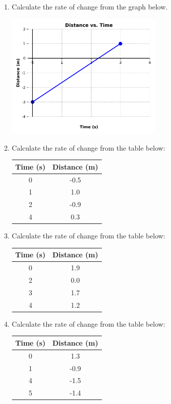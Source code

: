 \documentclass[12pt]{article}
\begin{document}
\begin{enumerate}
\vspace{2cm}  %
\item Calculate the rate of change from the graph below.

\includegraphics[width=0.6\textwidth]{A_problem_4.png}


\vspace{2cm}  %
\item Calculate the rate of change from the table below:

\begin{tabular}{|c|c|}
\hline
Time (s) & Distance (m) \\
\hline
0 & -0.5 \\
1 & 1.0 \\
2 & -0.9 \\
4 & 0.3 \\
\hline
\end{tabular}

\vspace{2cm}
\item Calculate the rate of change from the table below:

\begin{tabular}{|c|c|}
\hline
Time (s) & Distance (m) \\
\hline
0 & 1.9 \\
2 & 0.0 \\
3 & 1.7 \\
4 & 1.2 \\
\hline
\end{tabular}

\vspace{2cm}
\item Calculate the rate of change from the table below:

\begin{tabular}{|c|c|}
\hline
Time (s) & Distance (m) \\
\hline
0 & 1.3 \\
1 & -0.9 \\
4 & -1.5 \\
5 & -1.4 \\
\hline
\end{tabular}


\end{enumerate}
\end{document}
